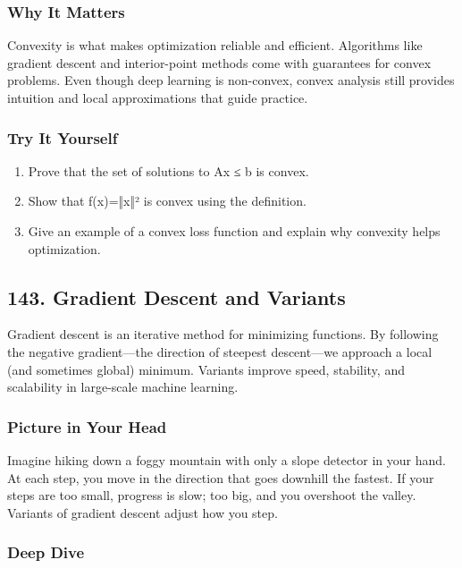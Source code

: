 \documentclass[
  letterpaper,
  DIV=11,
  numbers=noendperiod]{scrreprt}
\providecommand{\tightlist}{%
  \setlength{\itemsep}{0pt}\setlength{\parskip}{0pt}}
\begin{document}
\subsubsection{Why It Matters}\label{why-it-matters-39}

Convexity is what makes optimization reliable and efficient. Algorithms
like gradient descent and interior-point methods come with guarantees
for convex problems. Even though deep learning is non-convex, convex
analysis still provides intuition and local approximations that guide
practice.

\subsubsection{Try It Yourself}\label{try-it-yourself-141}

\begin{enumerate}
\def\labelenumi{\arabic{enumi}.}
\tightlist
\item
  Prove that the set of solutions to Ax ≤ b is convex.
\item
  Show that f(x)=‖x‖² is convex using the definition.
\item
  Give an example of a convex loss function and explain why convexity
  helps optimization.
\end{enumerate}

\subsection{143. Gradient Descent and
Variants}\label{gradient-descent-and-variants}

Gradient descent is an iterative method for minimizing functions. By
following the negative gradient---the direction of steepest descent---we
approach a local (and sometimes global) minimum. Variants improve speed,
stability, and scalability in large-scale machine learning.

\subsubsection{Picture in Your Head}\label{picture-in-your-head-142}

Imagine hiking down a foggy mountain with only a slope detector in your
hand. At each step, you move in the direction that goes downhill the
fastest. If your steps are too small, progress is slow; too big, and you
overshoot the valley. Variants of gradient descent adjust how you step.

\subsubsection{Deep Dive}\label{deep-dive-142}
\end{document}
